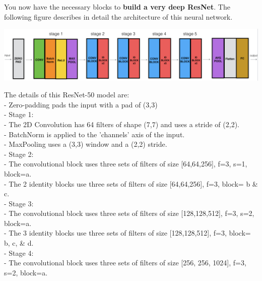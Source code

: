 \documentclass[11pt, a4paper]{article}
\begin{document}
\begin{spacing}{1.1}
	\noindent You now have the necessary blocks to \textbf{build a very deep ResNet}. The following figure describes in detail the architecture of this neural network. 
	\begin{center} \includegraphics[scale=.65]{deep_res}	\end{center}
	The details of this ResNet-50 model are: \vspace*{.5mm}\\
	- Zero-padding pads the input with a pad of (3,3)\vspace*{.5mm}\\
	- Stage 1:\\
	\hspace*{4mm} - The 2D Convolution has 64 filters of shape (7,7) and uses a stride of (2,2). \\
	\hspace*{4mm} - BatchNorm is applied to the 'channels' axis of the input.\\
	\hspace*{4mm} - MaxPooling uses a (3,3) window and a (2,2) stride.\vspace*{.5mm}\\
	- Stage 2:\\
	\hspace*{4mm} - The convolutional block uses three sets of filters of size [64,64,256], f=3, s=1, block=a.\\
	\hspace*{4mm} - The 2 identity blocks use three sets of filters of size [64,64,256], f=3, block= b \& c.\vspace*{.5mm}\\
	- Stage 3:\\
	\hspace*{4mm} - The convolutional block uses three sets of filters of size [128,128,512], f=3, s=2, block=a.\\
	\hspace*{4mm} - The 3 identity blocks use three sets of filters of size [128,128,512], f=3, block= b, c, \& d.\vspace*{.5mm}\\
	- Stage 4:\\
	\hspace*{4mm} - The convolutional block uses three sets of filters of size [256, 256, 1024], f=3, s=2, block=a.\\

\end{spacing}
\end{document}
